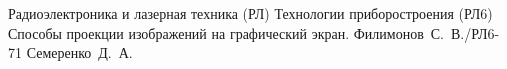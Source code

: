 \documentclass{bmstu}
\begin{document}

\makecourseworktitle
	{Радиоэлектроника и лазерная техника (РЛ)}
	{Технологии приборостроения (РЛ6)}
	{Способы проекции изображений на графический экран.}
	{Филимонов~С.~В./РЛ6-71}
	{Семеренко~Д.~А.}
	{}
	{}
	{}

\maketableofcontents

%
%



%
\end{document}
